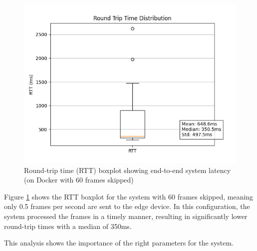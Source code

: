 \documentclass[conference]{IEEEtran}
\begin{document}
\begin{figure}[!htbp]
    \centering
    \includegraphics[width=1\linewidth]{./res/rtt_distribution-docker_test-60skip.png}
    \caption{Round-trip time (RTT) boxplot showing end-to-end system latency (on Docker with 60 frames skipped)}
    \label{fig:rtt_distribution_docker60}
\end{figure}

Figure \ref{fig:rtt_distribution_docker60} shows the RTT boxplot for the system with 60 frames skipped, meaning only 0.5 frames per second are sent to the edge device. In this configuration, the system processed the frames in a timely manner, resulting in significantly lower round-trip times with a median of 350ms.

This analysis shows the importance of the right parameters for the system. 
\end{document}
